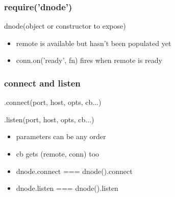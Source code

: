 \documentclass{beamer}
\begin{document}
\begin{frame}
    \frametitle{require('dnode')}
    \large
    dnode(object or constructor to expose)
    \newline
    
    \normalsize
    \fbox{}
    \newline
    
    \begin{itemize}
    \pause
    \item remote is available but hasn't been populated yet
    
    \pause
    \item conn.on('ready', fn) fires when remote is ready
    \end{itemize}
\end{frame}

\begin{frame}
    \frametitle{connect and listen}
    \large
    
    .connect(port, host, opts, cb...)
    
    .listen(port, host, opts, cb...)
    
    \begin{itemize}
    \item parameters can be any order
    \pause
    \item cb gets (remote, conn) too
    \pause
    \item dnode.connect === dnode({}).connect
    \item dnode.listen === dnode({}).listen
    \end{itemize}
\end{frame}
\end{document}
